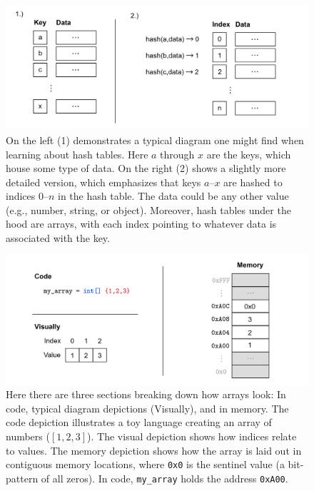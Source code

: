 \begin{figure}[ht!]
    \centering
    \includegraphics[width=\textwidth]{./Sections/stacks_heaps/hash_table.png}
    \caption{On the left (1) demonstrates a typical diagram one might find when learning about hash tables. Here $a$ through $x$ are the keys, which house some type of 
    data. On the right (2) shows a slightly more detailed version, which emphasizes that keys $a$--$x$ are hashed to indices $0$--$n$ in the hash table. The data could be any other 
    value (e.g., number, string, or object). Moreover, hash tables under the hood are arrays, with each index pointing to whatever data is associated with the key.}
    \label{fig:call_stack_after}
\end{figure}

\begin{figure}[ht!]
    \centering
    \includegraphics[width=\textwidth]{./Sections/stacks_heaps/arrays.png}
    \caption{Here there are three sections breaking down how arrays look: In code, typical diagram depictions (Visually), and in memory. The 
    code depiction illustrates a toy language creating an array of numbers ($[1,2,3]$). The visual depiction shows how indices relate to values. The 
    memory depiction shows how the array is laid out in contiguous memory locations, where \texttt{0x0} is the sentinel value (a bit-pattern of all zeros). 
    In code, \texttt{my\_array} holds the address \texttt{0xA00}.}
    \label{fig:array_memory}
\end{figure}

